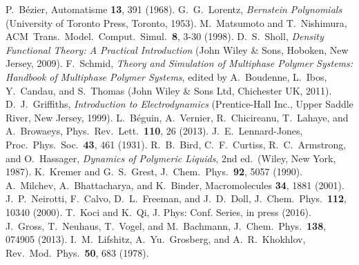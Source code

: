 %
P.~B{\'e}zier, Automatisme  \textbf{13}, 391 (1968).
%
G.~G.~Lorentz, \emph{Bernstein Polynomials} (University of Toronto Press, Toronto, 1953).
%
M.~Matsumoto and T.~Nishimura, ACM\ Trans.\ Model.\ Comput.\ Simul.\ \textbf{8}, 3-30 (1998).
%
%
%
D.~S.~Sholl, \emph{Density Functional Theory: A Practical Introduction} (John Wiley \& Sons, Hoboken, New Jersey, 2009).
%
F.~Schmid, \emph{Theory and Simulation of Multiphase Polymer Systems:
Handbook of Multiphase Polymer Systems}, edited by A.~Boudenne, L.~Ibos,
Y.~Candau, and S.~Thomas (John Wiley \& Sons Ltd, Chichester UK, 2011).
%
D.~J.~Griffiths, \emph{Introduction to Electrodynamics} (Prentice-Hall Inc., Upper Saddle River, New Jersey, 1999).
%
L.~B\'eguin, A.~Vernier, R.~Chicireanu, T.~Lahaye, and A.~Browaeys, Phys.\ Rev.\ Lett.\ \textbf{110}, 26 (2013).
%
J.~E.~Lennard-Jones, Proc.\ Phys.\ Soc.\  \textbf{43}, 461 (1931).
%
%
R.~B.\ Bird, C.~F.\ Curtiss, R.~C.\ Armstrong, and O.~Hassager,
\emph{Dynamics of Polymeric Liquids}, 2nd ed.\ (Wiley, New York,
1987).
%
K.~Kremer and G.~S.\ Grest, J.~Chem.\ Phys.\ \textbf{92}, 5057 (1990).
%
A.~Milchev, A.~Bhattacharya, and K.~Binder, Macromolecules \textbf{34},
1881 (2001).
%
J.~P.~Neirotti, F.~Calvo, D.~L.~Freeman, and J.~D.~Doll, J.~Chem.\ Phys.\ \textbf{112}, 10340 (2000).
%
T.~Koci and K.~Qi, J. Phys: Conf. Series, in press (2016).
%
%
%
J.~Gross, T.~Neuhaus, T.~Vogel, and M.~Bachmann, J.~Chem.\ Phys.\
\textbf{138}, 074905 (2013).
%
%
I.~M.\ Lifshitz, A.~Yu.\ Grosberg, and A.~R.\ Khokhlov, Rev.\ Mod.\
Phys.\ \textbf{50}, 683 (1978).
%
